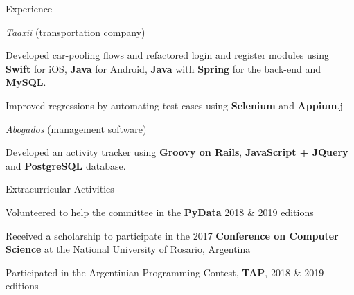 \documentclass{curriculum}
\begin{document}
\begin{cvsection}{Experience}
\begin{sectionitemlist}
        \item{\textit{Taaxii} (transportation company)}
            \begin{sectionitemlist}
            \item{
                Developed car-pooling flows and refactored login and register
                modules using \textbf{Swift} for iOS, \textbf{Java} for Android,
                \textbf{Java} with \textbf{Spring} for the back-end and \textbf{MySQL}.
            }
            \item{
                Improved regressions by automating test cases
                using \textbf{Selenium} and \textbf{Appium}.j
            }
            \end{sectionitemlist}

        \item{\textit{Abogados} (management software)}
            \begin{sectionitemlist}
            \item{
                Developed an activity tracker using
                \textbf{Groovy on Rails}, \textbf{JavaScript + JQuery}
                and \textbf{PostgreSQL} database.
            }
            \end{sectionitemlist}

        \end{sectionitemlist}

\end{cvsection}


\begin{cvsection}{Extracurricular Activities}
    \begin{sectionitemlist}
        \item {Volunteered to help the committee in the \textbf{PyData} 2018 \& 2019 editions}
        \item {Received a scholarship to participate in the 2017 \textbf{Conference on Computer Science} at the National University of Rosario, Argentina}
        \item {Participated in the Argentinian Programming Contest, \textbf{TAP}, 2018 \& 2019 editions}
    \end{sectionitemlist}
\end{cvsection}

\end{document}
